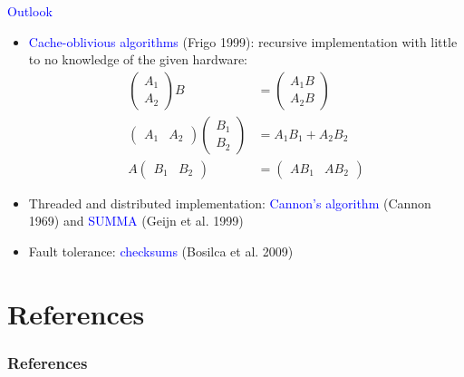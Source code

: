\documentclass[11pt]{beamer}
\begin{document}
\begin{frame}{\textcolor{blue}{Outlook}}

\begin{itemize}
\item \textcolor{blue}{Cache-oblivious algorithms} (Frigo 1999): recursive implementation with little to no knowledge of the given hardware:
\begin{align*}
\left(
\begin{array}{c}
A_1\\ A_2
\end{array}
\right) B &= 
\left(
\begin{array}{c}
A_1 B\\ A_2 B
\end{array}
\right) \\
\left(\begin{array}{cc}
A_1 & A_2
\end{array}\right) 
\left(\begin{array}{c}
B_1\\ B_2
\end{array}\right)
&= 
A_1B_1+A_2B_2 \\
A\left(\begin{array}{cc}
B_1 & B_2
\end{array}\right)
&= 
\left(\begin{array}{cc}
AB_1 & AB_2
\end{array}\right)
\end{align*}
\item Threaded and distributed implementation: \textcolor{blue}{Cannon's algorithm} (Cannon 1969) and \textcolor{blue}{SUMMA} (Geijn et al. 1999)
\item Fault tolerance: \textcolor{blue}{checksums} (Bosilca et al. 2009)
\end{itemize}

\end{frame}

\section{References}

\begin{frame}
\frametitle{{\color{blue}References}}
\vspace{0cm}
{\scriptsize }
\end{frame}
\end{document}
